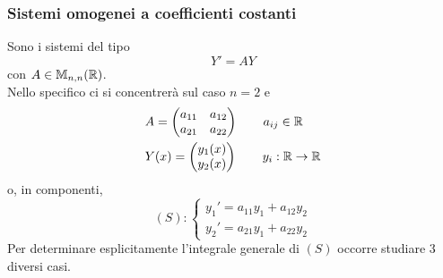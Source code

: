 \subsubsection{Sistemi omogenei a coefficienti costanti}
Sono i sistemi del tipo
\begin{equation}
    Y'=AY
\end{equation}
con $A \in \mathbb{M}_{n,n}(\mathbb{R})$.\\
Nello specifico ci si concentrerà sul caso $n=2$ e
\begin{align}    
    &A=\begin{pmatrix}
        a_{11} & a_{12}\\
        a_{21} & a_{22}
    \end{pmatrix} \qquad a_{ij} \in \mathbb{R} \\
    &Y(x)=\begin{pmatrix}
        y_1(x)\\
        y_2(x)
    \end{pmatrix} \qquad y_i:\mathbb{R} \to \mathbb{R}
\end{align}
o, in componenti,
\begin{equation}
    (S): \begin{cases}
        y_1'=a_{11} y_1 + a_{12} y_2\\
        y_2'=a_{21} y_1 + a_{22} y_2
    \end{cases}
\end{equation}
Per determinare esplicitamente l'integrale generale di $(S)$ occorre studiare 3 diversi casi.
